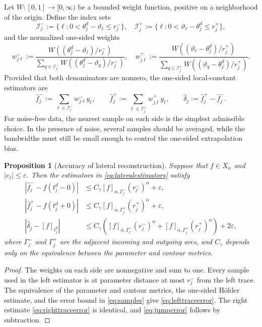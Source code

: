 \documentclass[11pt,a4paper]{amsart}
\theoremstyle{plain}
\newtheorem{proposition}[theorem]{Proposition}
\theoremstyle{definition}
\theoremstyle{remark}
\newcommand{\Ga}{\Gamma}
\begin{document}
Let $W:[0,1]\to[0,\infty)$ be a bounded weight function, positive on a neighborhood of the origin.  Define the index sets
\[
 \mathcal I_j^-:=\{\ell:0<\theta_j^d-\vartheta_\ell\le r_j^-\}, \quad
 \mathcal I_j^+:=\{\ell:0<\vartheta_\ell-\theta_j^d\le r_j^+\},
\]
and the normalized one-sided weights
\[
 w_{j\ell}^-:=
 \frac{W((\theta_j^d-\vartheta_\ell)/r_j^-)}
 {\sum_{q\in\mathcal I_j^-}W((\theta_j^d-\vartheta_q)/r_j^-)},\quad
 w_{j\ell}^+:=
 \frac{W((\vartheta_\ell-\theta_j^d)/r_j^+)}
 {\sum_{q\in\mathcal I_j^+}W((\vartheta_q-\theta_j^d)/r_j^+)}.
\]
Provided that both denominators are nonzero, the one-sided local-constant estimators are
\begin{equation}\label{eq:lateralestimators}
 \widehat f_j^-:=\sum_{\ell\in\mathcal I_j^-}w_{j\ell}^-y_\ell,
 \qquad
 \widehat f_j^+:=\sum_{\ell\in\mathcal I_j^+}w_{j\ell}^+y_\ell,
 \qquad
 \widehat\delta_j:=\widehat f_j^+-\widehat f_j^-.
\end{equation}
For noise-free data, the nearest sample on each side is the simplest admissible choice.  In the presence of noise, several samples should be averaged, while the bandwidths must still be small enough to control the one-sided extrapolation bias.

\begin{proposition}[Accuracy of lateral reconstruction]\label{prop:lateralerror}
Suppose that $f\in X_\alpha$ and $|e_\ell|\le\varepsilon$.  Then the estimators in \eqref{eq:lateralestimators} satisfy
\begin{align}
 |\widehat f_j^- - f(t_j^d-0)|
 &\le C_\gamma[f]_{\alpha,\Ga_j^-}(r_j^-)^\alpha+\varepsilon,\label{eq:lefttraceerror}\\
 |\widehat f_j^+ - f(t_j^d+0)|
 &\le C_\gamma[f]_{\alpha,\Ga_j^+}(r_j^+)^\alpha+\varepsilon,\label{eq:righttraceerror}\\
 |\widehat\delta_j-[f]_{t_j^d}|
 &\le C_\gamma\left([f]_{\alpha,\Ga_j^-}(r_j^-)^\alpha
      +[f]_{\alpha,\Ga_j^+}(r_j^+)^\alpha\right)+2\varepsilon,
 \label{eq:jumperror}
\end{align}
where $\Ga_j^-$ and $\Ga_j^+$ are the adjacent incoming and outgoing arcs, and $C_\gamma$ depends only on the equivalence between the parameter and contour metrics.
\end{proposition}

\begin{proof}
The weights on each side are nonnegative and sum to one.  Every sample used in the left estimator is at parameter distance at most $r_j^-$ from the left trace.  The equivalence of the parameter and contour metrics, the one-sided H\"older estimate, and the error bound in \eqref{eq:samples} give \eqref{eq:lefttraceerror}.  The right estimate \eqref{eq:righttraceerror} is identical, and \eqref{eq:jumperror} follows by subtraction.
\end{proof}
\end{document}
